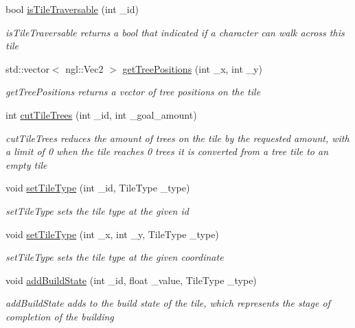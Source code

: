\begin{DoxyCompactItemize}
bool \hyperlink{class_grid_a541a681c0497176f4e4aa36e23a687bc}{is\+Tile\+Traversable} (int \+\_\+id)
\begin{DoxyCompactList}\small\item\em is\+Tile\+Traversable returns a bool that indicated if a character can walk across this tile \end{DoxyCompactList}\item 
std\+::vector$<$ ngl\+::\+Vec2 $>$ \hyperlink{class_grid_a28e2f58bb6da036f9ee7d4c4fef1b0a4}{get\+Tree\+Positions} (int \+\_\+x, int \+\_\+y)
\begin{DoxyCompactList}\small\item\em get\+Tree\+Positions returns a vector of tree positions on the tile \end{DoxyCompactList}\item 
int \hyperlink{class_grid_a3af04499bd5cc782c2eb8c49e69fe240}{cut\+Tile\+Trees} (int \+\_\+id, int \+\_\+goal\+\_\+amount)
\begin{DoxyCompactList}\small\item\em cut\+Tile\+Trees reduces the amount of trees on the tile by the requested amount, with a limit of 0 when the tile reaches 0 trees it is converted from a tree tile to an empty tile \end{DoxyCompactList}\item 
void \hyperlink{class_grid_a52522ff5ff2989211007b9e414bc1644}{set\+Tile\+Type} (int \+\_\+id, Tile\+Type \+\_\+type)
\begin{DoxyCompactList}\small\item\em set\+Tile\+Type sets the tile type at the given id \end{DoxyCompactList}\item 
void \hyperlink{class_grid_a3e3cf7aee6df8ed97a75ecc6a52e34e0}{set\+Tile\+Type} (int \+\_\+x, int \+\_\+y, Tile\+Type \+\_\+type)
\begin{DoxyCompactList}\small\item\em set\+Tile\+Type sets the tile type at the given coordinate \end{DoxyCompactList}\item 
void \hyperlink{class_grid_ab701ece767c2ddb1054521fb7332ab87}{add\+Build\+State} (int \+\_\+id, float \+\_\+value, Tile\+Type \+\_\+type)
\begin{DoxyCompactList}\small\item\em add\+Build\+State adds to the build state of the tile, which represents the stage of completion of the building \end{DoxyCompactList}\item 

\end{DoxyCompactItemize}
